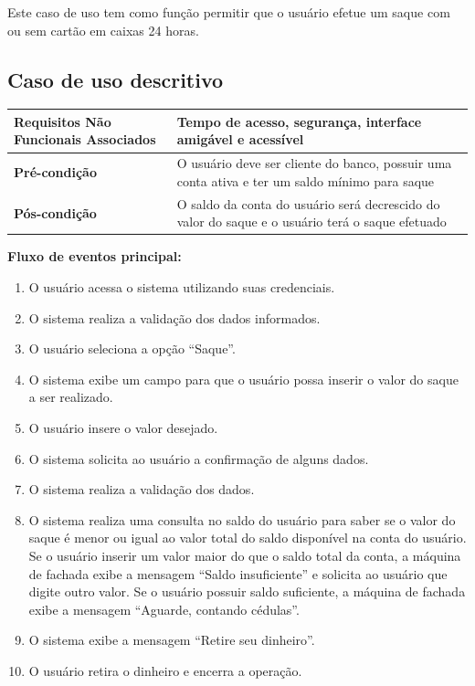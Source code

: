 Este caso de uso tem como função permitir que o usuário efetue um saque com ou sem cartão em caixas 24 horas.

\subsection{Caso de uso descritivo}

\begin{table}[h]
  \centering
  \begin{tabular}{|p{4cm} | p{10cm} |}
      \hline
      \small{\textbf{Requisitos Não Funcionais Associados}}	& Tempo de acesso, segurança, interface amigável e acessível	\\ \hline
      \small{\textbf{Pré-condição}}	&	O usuário deve ser cliente do banco, possuir uma conta ativa e ter um saldo mínimo para saque	\\ \hline
      \small{\textbf{Pós-condição}}	&	O saldo da conta do usuário será decrescido do valor do saque e o usuário terá o saque efetuado	\\ \hline
    \end{tabular}
\end{table}

\textbf{Fluxo de eventos principal:}

\begin{enumerate}
  \item O usuário acessa o sistema utilizando suas credenciais.
  \item O sistema realiza a validação dos dados informados.
  \item O usuário seleciona a opção ``Saque''.
  \item O sistema exibe um campo para que o usuário possa inserir o valor do saque a ser realizado.
  \item O usuário insere o valor desejado.
  \item O sistema solicita ao usuário a confirmação de alguns dados.
  \item O sistema realiza a validação dos dados.
  \item O sistema realiza uma consulta no saldo do usuário para saber se o valor do saque é menor ou igual ao valor total do saldo disponível na conta do usuário.
    \subitem Se o usuário inserir um valor maior do que o saldo total da conta, a máquina de fachada exibe a mensagem ``Saldo insuficiente'' e solicita ao usuário que digite outro valor.
    \subitem Se o usuário possuir saldo suficiente, a máquina de fachada exibe a mensagem ``Aguarde, contando cédulas''.
  \item O sistema exibe a mensagem ``Retire seu dinheiro''.
  \item O usuário retira o dinheiro e encerra a operação.
\end{enumerate}

